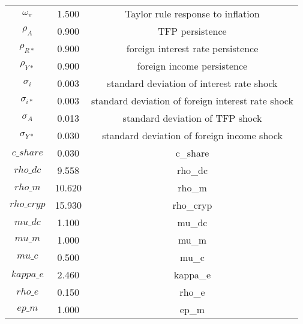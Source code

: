 \begin{center}
\begin{longtable}{ccc}
$\omega_{\pi}$ 	 & 	 1.500 	 & 	 Taylor rule response to inflation\\
$\rho_{A}$ 	 & 	 0.900 	 & 	 TFP persistence\\
$\rho_{R*}$ 	 & 	 0.900 	 & 	 foreign interest rate persistence\\
$\rho_{Y*}$ 	 & 	 0.900 	 & 	 foreign income persistence\\
$\sigma_{i}$ 	 & 	 0.003 	 & 	 standard deviation of interest rate shock\\
$\sigma_{i*}$ 	 & 	 0.003 	 & 	 standard deviation of foreign interest rate shock\\
$\sigma_{A}$ 	 & 	 0.013 	 & 	 standard deviation of TFP shock\\
$\sigma_{Y*}$ 	 & 	 0.030 	 & 	 standard deviation of foreign income shock\\
$c\_share$ 	 & 	 0.030 	 & 	 c\_share\\
$rho\_dc$ 	 & 	 9.558 	 & 	 rho\_dc\\
$rho\_m$ 	 & 	 10.620 	 & 	 rho\_m\\
$rho\_cryp$ 	 & 	 15.930 	 & 	 rho\_cryp\\
$mu\_dc$ 	 & 	 1.100 	 & 	 mu\_dc\\
$mu\_m$ 	 & 	 1.000 	 & 	 mu\_m\\
$mu\_c$ 	 & 	 0.500 	 & 	 mu\_c\\
$kappa\_e$ 	 & 	 2.460 	 & 	 kappa\_e\\
$rho\_e$ 	 & 	 0.150 	 & 	 rho\_e\\
$ep\_m$ 	 & 	 1.000 	 & 	 ep\_m\\
\bottomrule%
\end{longtable}
\end{center}
